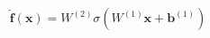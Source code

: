 \documentclass[preview]{standalone}
\begin{document}
\begin{align*}
\hat{\mathbf{f}}(\mathbf{x}) = W^{(2)} \sigma\left(W^{(1)} \mathbf{x} + \mathbf{b}^{(1)}\right)
\end{align*}
\end{document}
